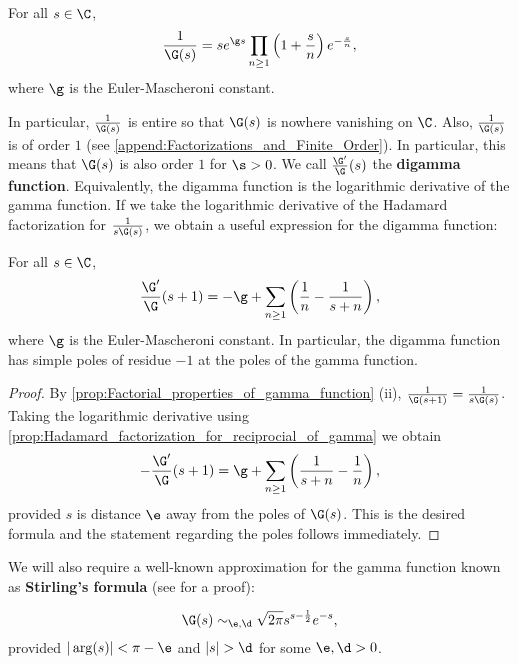       \begin{proposition}\label{prop:Hadamard_factorization_for_reciprocial_of_gamma}
        For all $s \in \C$,
        \[
          \frac{1}{\G(s)} = se^{\g s}\prod_{n \ge 1}\left(1+\frac{s}{n}\right)e^{-\frac{s}{n}},
        \]
        where $\g$ is the Euler-Mascheroni constant.
      \end{proposition}

      In particular, $\frac{1}{\G(s)}$ is entire so that $\G(s)$ is nowhere vanishing on $\C$. Also, $\frac{1}{\G(s)}$ is of order $1$ (see \cref{append:Factorizations_and_Finite_Order}). In particular, this means that $\G(s)$ is also order $1$ for $\s > 0$. We call $\frac{\G'}{\G}(s)$ the \textbf{digamma function}. Equivalently, the digamma function is the logarithmic derivative of the gamma function. If we take the logarithmic derivative of the Hadamard factorization for $\frac{1}{s\G(s)}$, we obtain a useful expression for the digamma function:

      \begin{corollary}\label{cor:logarithmic_derivative_of_gamma}
        For all $s \in \C$,
        \[
          \frac{\G'}{\G}(s+1) = -\g+\sum_{n \ge 1}\left(\frac{1}{n}-\frac{1}{s+n}\right),
        \]
        where $\g$ is the Euler-Mascheroni constant. In particular, the digamma function has simple poles of residue $-1$ at the poles of the gamma function.
      \end{corollary}
      \begin{proof}
        By \cref{prop:Factorial_properties_of_gamma_function} (ii), $\frac{1}{\G(s+1)} = \frac{1}{s\G(s)}$. Taking the logarithmic derivative using \cref{prop:Hadamard_factorization_for_reciprocial_of_gamma} we obtain
        \[
          -\frac{\G'}{\G}(s+1) = \g+\sum_{n \ge 1}\left(\frac{1}{s+n}-\frac{1}{n}\right),
        \]
        provided $s$ is distance $\e$ away from the poles of $\G(s)$. This is the desired formula and the statement regarding the poles follows immediately.
      \end{proof}
      
      We will also require a well-known approximation for the gamma function known as \textbf{Stirling's formula} (see \cite{remmert1998classical} for a proof):

      \begin{theorem}
      \phantom{}
        \[
          \G(s) \sim_{\e,\d} \sqrt{2\pi}s^{s-\frac{1}{2}}e^{-s},
        \]
        provided $|\arg(s)| < \pi-\e$ and $|s| > \d$ for some $\e,\d > 0$.
      \end{theorem}


